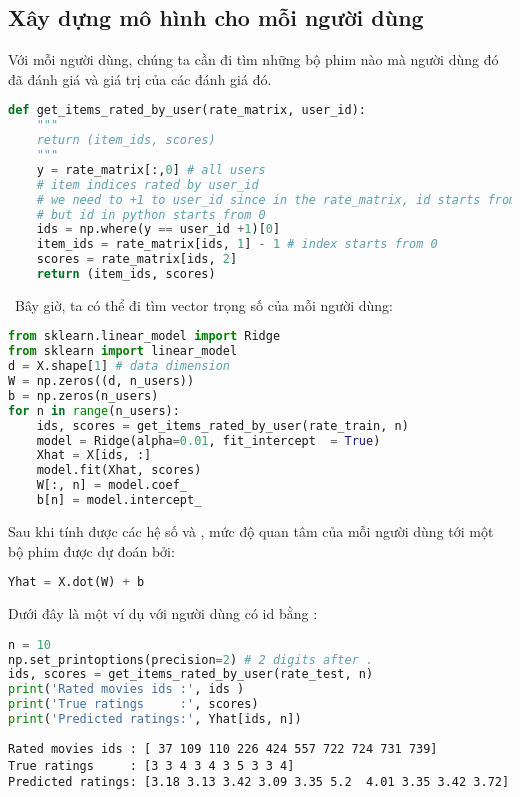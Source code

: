 \subsection{Xây dựng mô hình cho mỗi người dùng}
Với mỗi người dùng, chúng ta cần đi tìm những bộ phim nào mà
người dùng đó đã đánh giá và giá trị của các đánh giá đó. 
\begin{lstlisting}[language=Python]
def get_items_rated_by_user(rate_matrix, user_id):
    """
    return (item_ids, scores)
    """
    y = rate_matrix[:,0] # all users
    # item indices rated by user_id
    # we need to +1 to user_id since in the rate_matrix, id starts from 1 
    # but id in python starts from 0
    ids = np.where(y == user_id +1)[0] 
    item_ids = rate_matrix[ids, 1] - 1 # index starts from 0 
    scores = rate_matrix[ids, 2]
    return (item_ids, scores)
\end{lstlisting}
\
Bây giờ, ta có thể đi tìm vector trọng số của mỗi người dùng: 
 
\begin{lstlisting}[language=Python]
from sklearn.linear_model import Ridge
from sklearn import linear_model
d = X.shape[1] # data dimension
W = np.zeros((d, n_users))
b = np.zeros(n_users)
for n in range(n_users):    
    ids, scores = get_items_rated_by_user(rate_train, n)
    model = Ridge(alpha=0.01, fit_intercept  = True)
    Xhat = X[ids, :]
    model.fit(Xhat, scores) 
    W[:, n] = model.coef_
    b[n] = model.intercept_
\end{lstlisting}
 
Sau khi tính được các hệ số  và ,
mức độ quan tâm của mỗi người dùng tới một bộ phim được dự đoán
bởi:
\begin{lstlisting}[language=Python]
Yhat = X.dot(W) + b 
\end{lstlisting}
 
Dưới đây là một ví dụ với người dùng có {id} bằng :
 
\begin{lstlisting}[language=Python]
n = 10
np.set_printoptions(precision=2) # 2 digits after . 
ids, scores = get_items_rated_by_user(rate_test, n)
print('Rated movies ids :', ids )
print('True ratings     :', scores)
print('Predicted ratings:', Yhat[ids, n])
\end{lstlisting}
\kq 
\begin{lstlisting}
Rated movies ids : [ 37 109 110 226 424 557 722 724 731 739]
True ratings     : [3 3 4 3 4 3 5 3 3 4]
Predicted ratings: [3.18 3.13 3.42 3.09 3.35 5.2  4.01 3.35 3.42 3.72]
\end{lstlisting}
 
